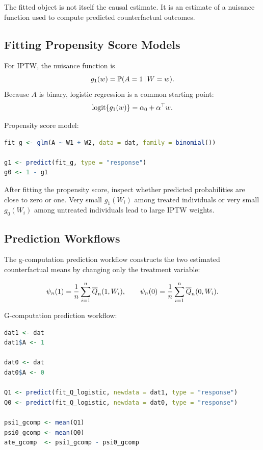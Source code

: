 The fitted object is not itself the causal estimate. It is an estimate of a nuisance
function used to compute predicted counterfactual outcomes.

\subsection{Fitting Propensity Score Models}

For IPTW, the nuisance function is
\[
g_1(w)=\mathbb{P}(A=1\,\vert\, W=w).
\]
Because $A$ is binary, logistic regression is a common starting point:
\[
\operatorname{logit}\{g_1(w)\}=\alpha_0+\alpha^\top w.
\]

\begin{implementationbox}
Propensity score model:
\begin{lstlisting}[language=R]
fit_g <- glm(A ~ W1 + W2, data = dat, family = binomial())

g1 <- predict(fit_g, type = "response")
g0 <- 1 - g1
\end{lstlisting}
\end{implementationbox}

After fitting the propensity score, inspect whether predicted probabilities are close
to zero or one. Very small $g_1(W_i)$ among treated individuals or very small
$g_0(W_i)$ among untreated individuals lead to large IPTW weights.

\subsection{Prediction Workflows}

The g-computation prediction workflow constructs the two estimated counterfactual
means by changing only the treatment variable:

\[
\psi_n(1)=\frac{1}{n}\sum_{i=1}^n\overline{Q}_n(1,W_i),
\qquad
\psi_n(0)=\frac{1}{n}\sum_{i=1}^n\overline{Q}_n(0,W_i).
\]

\begin{implementationbox}
G-computation prediction workflow:
\begin{lstlisting}[language=R]
dat1 <- dat
dat1$A <- 1

dat0 <- dat
dat0$A <- 0

Q1 <- predict(fit_Q_logistic, newdata = dat1, type = "response")
Q0 <- predict(fit_Q_logistic, newdata = dat0, type = "response")

psi1_gcomp <- mean(Q1)
psi0_gcomp <- mean(Q0)
ate_gcomp  <- psi1_gcomp - psi0_gcomp
\end{lstlisting}
\end{implementationbox}

